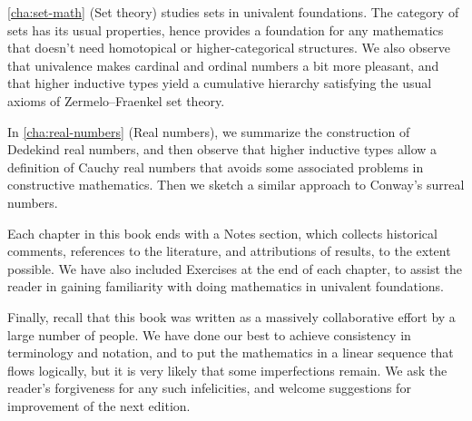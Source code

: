 \autoref{cha:set-math} (Set theory) studies sets in univalent foundations.
The category of sets has its usual properties, hence provides a foundation for any mathematics that doesn't need homotopical or higher-categorical structures.
We also observe that univalence makes cardinal and ordinal numbers a bit more pleasant, and that higher inductive types yield a cumulative hierarchy satisfying the usual axioms of Zermelo--Fraenkel set theory.

In \autoref{cha:real-numbers} (Real numbers), we summarize the construction of Dedekind real numbers, and then observe that higher inductive types allow a definition of Cauchy real numbers that avoids some associated problems in constructive mathematics.
Then we sketch a similar approach to Conway's surreal numbers.

Each chapter in this book ends with a Notes section, which collects historical comments, references to the literature, and attributions of results, to the extent possible.
We have also included Exercises at the end of each chapter, to assist the reader in gaining familiarity with doing mathematics in univalent foundations.

Finally, recall that this book was written as a massively collaborative effort by a large number of people.
We have done our best to achieve consistency in terminology and notation, and to put the mathematics in a linear sequence that flows logically, but it is very likely that some imperfections remain.
We ask the reader's forgiveness for any such infelicities, and welcome suggestions for improvement of the next edition.


